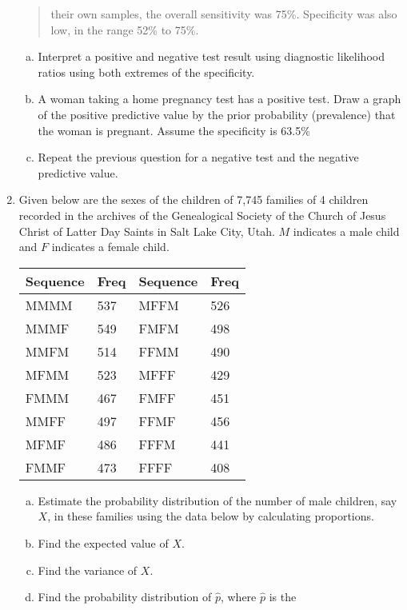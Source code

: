 \documentclass[12pt]{article}
\begin{document}
\begin{enumerate}[Problem 1.]
\begin{quote}
  their own samples, the overall sensitivity was 75\%. Specificity was
  also low, in the range 52\% to 75\%.
\end{quote}
\begin{enumerate}[a.]
\item Interpret a positive and negative test result using diagnostic
  likelihood ratios using both extremes of the specificity.
\item A woman taking a home pregnancy test has a positive test. Draw a
  graph of the positive predictive value by the prior probability
  (prevalence) that the woman is pregnant. Assume the specificity is 63.5\%
\item Repeat the previous question for a negative test and the negative
  predictive value.
\end{enumerate}
 \item Given below are the sexes of the children of 7,745 families of 4 children
    recorded in the archives of the Genealogical Society of the Church of Jesus Christ
    of Latter Day Saints in Salt Lake City, Utah. $M$ indicates a male child and
    $F$ indicates a female child.
    \begin{center}
    \begin{tabular}{llll}
      Sequence & Freq & Sequence & Freq \\ \hline
      MMMM & 537 & MFFM & 526 \\
      MMMF & 549 & FMFM & 498 \\
      MMFM & 514 & FFMM & 490 \\
      MFMM & 523 & MFFF & 429 \\
      FMMM & 467 & FMFF & 451 \\
      MMFF & 497 & FFMF & 456 \\
      MFMF & 486 & FFFM & 441 \\
      FMMF & 473 & FFFF & 408 \\ \hline
    \end{tabular}
    \end{center}
    \begin{enumerate}[a.]
    \item Estimate the probability distribution of the number of male children, say $X$,
      in these families using the data below by calculating proportions.
    \item Find the expected value of $X$.
    \item Find the variance of $X$.
    \item Find the probability distribution of $\hat p$, where $\hat p$ is the

\end{enumerate}
\end{enumerate}
\end{document}
